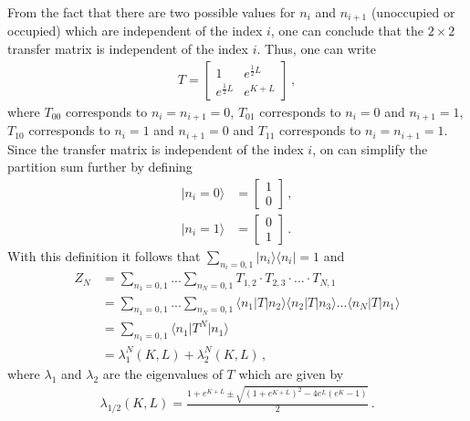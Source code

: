 From the fact that there are two possible values for $n_i$ 
and $n_{i+1}$ (unoccupied or occupied) which are independent 
of the index $i$, one can conclude that the $2\times 2$ transfer 
matrix is independent of the index $i$. Thus, one can write
\begin{align}
	T =
	\begin{bmatrix}
    1                & e^{\frac{1}{2}L} \\
    e^{\frac{1}{2}L} & e^{K + L}
    \end{bmatrix} \,,
\end{align}
where $T_{00}$ corresponds to $n_i=n_{i+1}=0$, $T_{01}$ corresponds 
to $n_i=0$ and $n_{i+1}=1$, $T_{10}$ corresponds to $n_i=1$ and 
$n_{i+1}=0$ and $T_{11}$ corresponds to $n_i=n_{i+1}=1$.
Since the transfer matrix is independent of the index $i$, on 
can simplify the partition sum further by defining
\begin{align}
	\vert n_i = 0 \rangle &= 
	\begin{bmatrix}
    1 \\
    0
    \end{bmatrix} \,, \\
    \vert n_i = 1 \rangle &= 
	\begin{bmatrix}
    0 \\
    1
    \end{bmatrix} \,.
\end{align}
With this definition it follows that 
$\sum_{n_i=0,1} \vert n_i\rangle \langle n_i\vert = 1$ and 
\begin{align}
	Z_N &= \sum_{n_1=0,1} ... \sum_{n_N=0,1}
	T_{1,2} \cdot T_{2,3} \cdot ... \cdot T_{N,1} \\
	&= \sum_{n_1=0,1} ... \sum_{n_N=0,1}
	\langle n_1 \vert T \vert n_2 \rangle 
	\langle n_2 \vert T \vert n_3 \rangle ... 
	\langle n_N \vert T \vert n_1 \rangle \\
	&= \sum_{n_1=0,1} 
	\langle n_1 \vert T^N \vert n_1 \rangle \\
	&= \lambda_1^N(K,L) + \lambda_2^N(K,L) \,,
\end{align}
where $\lambda_1$ and $\lambda_2$ are the eigenvalues of $T$ 
which are given by
\begin{align}
	\lambda_{1/2}(K,L) = 
	\frac{1+e^{K+L}\pm\sqrt{(1+e^{K+L})^2-4e^L(e^K-1)}}{2} \,. 
\end{align}

